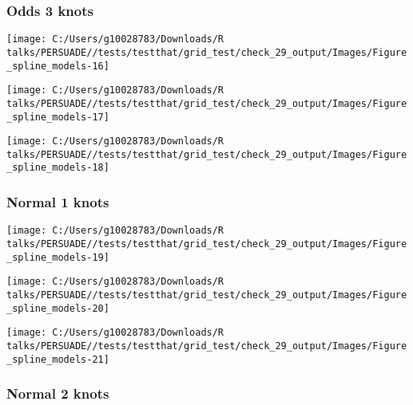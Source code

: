 \documentclass[
]{article}
\begin{document}
\clearpage

\subsubsection{Odds 3 knots}\label{odds-3-knots}

\begin{flushleft}\texttt{[image: C:/Users/g10028783/Downloads/R talks/PERSUADE//tests/testthat/grid\_test/check\_29\_output/Images/Figure\_spline\_models-16]} \end{flushleft}

\begin{flushleft}\texttt{[image: C:/Users/g10028783/Downloads/R talks/PERSUADE//tests/testthat/grid\_test/check\_29\_output/Images/Figure\_spline\_models-17]} \end{flushleft}

\begin{flushleft}\texttt{[image: C:/Users/g10028783/Downloads/R talks/PERSUADE//tests/testthat/grid\_test/check\_29\_output/Images/Figure\_spline\_models-18]} \end{flushleft}

\clearpage

\subsubsection{Normal 1 knots}\label{normal-1-knots}

\begin{flushleft}\texttt{[image: C:/Users/g10028783/Downloads/R talks/PERSUADE//tests/testthat/grid\_test/check\_29\_output/Images/Figure\_spline\_models-19]} \end{flushleft}

\begin{flushleft}\texttt{[image: C:/Users/g10028783/Downloads/R talks/PERSUADE//tests/testthat/grid\_test/check\_29\_output/Images/Figure\_spline\_models-20]} \end{flushleft}

\begin{flushleft}\texttt{[image: C:/Users/g10028783/Downloads/R talks/PERSUADE//tests/testthat/grid\_test/check\_29\_output/Images/Figure\_spline\_models-21]} \end{flushleft}

\clearpage

\subsubsection{Normal 2 knots}\label{normal-2-knots}
\end{document}
